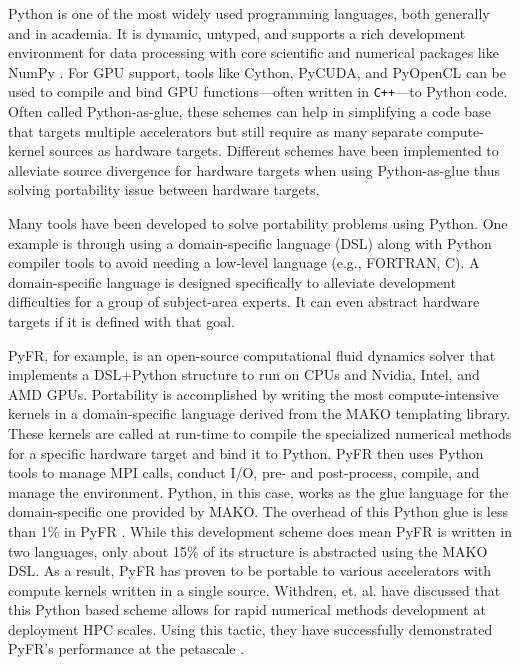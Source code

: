 
Python is one of the most widely used programming languages, both generally and in academia.
It is dynamic, untyped, and supports a rich development environment for data processing with core scientific and numerical packages like NumPy \cite{van_der_walt_numpy_2011}.
For GPU support, tools like Cython, PyCUDA, and PyOpenCL \cite{kloeckner_pycuda_2012} can be used to compile and bind GPU functions---often written in \texttt{C++}---to Python code.
Often called Python-as-glue, these schemes can help in simplifying a code base that targets multiple accelerators but still require as many separate compute-kernel sources as hardware targets.
Different schemes have been implemented to alleviate source divergence for hardware targets when using Python-as-glue thus solving portability issue between hardware targets.

Many tools have been developed to solve portability problems using Python.
One example is through using a domain-specific language (DSL) along with Python compiler tools to avoid needing a low-level language (e.g., FORTRAN, C).
A domain-specific language is designed specifically to alleviate development difficulties for a group of subject-area experts. 
It can even abstract hardware targets if it is defined with that goal.

PyFR, for example, is an open-source computational fluid dynamics solver that implements a DSL+Python structure \cite{witherden_pyfr_2014} to run on CPUs and Nvidia, Intel, and AMD GPUs. 
Portability is accomplished by writing the most compute-intensive kernels in a domain-specific language derived from the MAKO templating library. 
These kernels are called at run-time to compile the specialized numerical methods for a specific hardware target and bind it to Python. 
PyFR then uses Python tools to manage MPI calls, conduct I/O, pre- and post-process, compile, and manage the environment. 
Python, in this case, works as the glue language for the domain-specific one provided by MAKO. 
The overhead of this Python glue is less than 1\% in PyFR \cite{PyFR1p}.
While this development scheme does mean PyFR is written in two languages, only about 15\% of its structure is abstracted using the MAKO DSL.
As a result, PyFR has proven to be portable to various accelerators with compute kernels written in a single source. 
Withdren, et. al. \cite{pyfrPetascale} have discussed that this Python based scheme allows for rapid numerical methods development at deployment HPC scales. 
Using this tactic, they have successfully demonstrated PyFR's performance at the petascale \cite{pyfrPetascale}.

